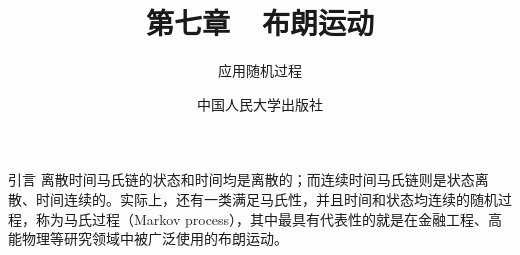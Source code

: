 \documentclass[t]{beamer}
\begin{document}
\fontsize{11}{18}\selectfont


\CTEXindent



  \title{第七章~~布朗运动}
\author{应用随机过程}
\date{中国人民大学出版社}
  \begin{frame}
    \maketitle
  \end{frame}

  \begin{frame}{引言}
    离散时间马氏链的状态和时间均是离散的；而连续时间马氏链则是状态离散、时间连续的。实际上，还有一类满足马氏性，并且时间和状态均连续的随机过程，称为马氏过程（Markov process），其中最具有代表性的就是在金融工程、高能物理等研究领域中被广泛使用的布朗运动。


\end{frame}
\end{document}
